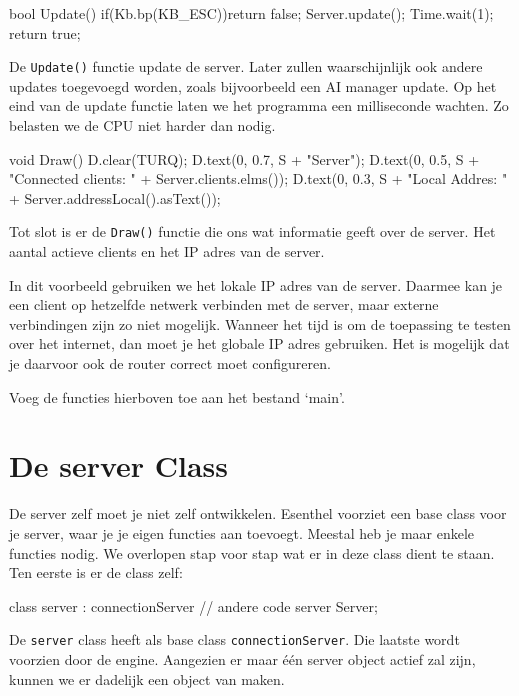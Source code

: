 \begin{code}
bool Update()
{
   if(Kb.bp(KB_ESC))return false;
   Server.update();
	 Time.wait(1);
   return true;
}
\end{code}

De \texttt{Update()} functie update de server. Later zullen waarschijnlijk ook andere updates toegevoegd worden, zoals bijvoorbeeld een AI manager update. Op het eind van de update functie laten we het programma een milliseconde wachten. Zo belasten we de CPU niet harder dan nodig.

\begin{code}
void Draw()
{
   D.clear(TURQ);
   D.text(0, 0.7, S + "Server");
   D.text(0, 0.5, S + "Connected clients: " + Server.clients.elms());
   D.text(0, 0.3, S + "Local Addres: " + Server.addressLocal().asText());
}
\end{code}

Tot slot is er de \texttt{Draw()} functie die ons wat informatie geeft over de server. Het aantal actieve clients en het IP adres van de server.

\begin{note}
In dit voorbeeld gebruiken we het lokale IP adres van de server. Daarmee kan je een client op hetzelfde netwerk verbinden met de server, maar externe verbindingen zijn zo niet mogelijk. Wanneer het tijd is om de toepassing te testen over het internet, dan moet je het globale IP adres gebruiken. Het is mogelijk dat je daarvoor ook de router correct moet configureren.
\end{note}

\begin{exercise}
Voeg de functies hierboven toe aan het bestand `main'.
\end{exercise}

\section{De server Class}
De server zelf moet je niet zelf ontwikkelen. Esenthel voorziet een base class voor je server, waar je je eigen functies aan toevoegt. Meestal heb je maar enkele functies nodig. We overlopen stap voor stap wat er in deze class dient te staan. Ten eerste is er de class zelf:

\begin{code}
class server : connectionServer
{
   // andere code
}
server Server;
\end{code}

De \texttt{server} class heeft als base class \texttt{connectionServer}. Die laatste wordt voorzien door de engine. Aangezien er maar \'e\'en server object actief zal zijn, kunnen we er dadelijk een object van maken. 

